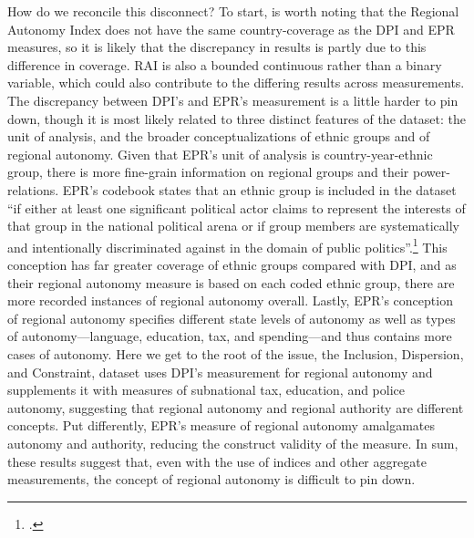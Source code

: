 \documentclass[12pt]{article}
\begin{document}
How do we reconcile this disconnect? To start, is worth noting that the Regional Autonomy Index does not have the same country-coverage as the DPI and EPR measures, so it is likely that the discrepancy in results is partly due to this difference in coverage. RAI is also a bounded continuous rather than a binary variable, which could also contribute to the differing results across measurements. The discrepancy between DPI's and EPR's measurement is a little harder to pin down, though it is most likely related to three distinct features of the dataset: the unit of analysis, and the broader conceptualizations of ethnic groups and of regional autonomy. Given that EPR's unit of analysis is country-year-ethnic group, there is more fine-grain information on regional groups and their power-relations. EPR's codebook states that an ethnic group is included in the dataset ``if either at least one significant political actor claims to represent the interests of that group in the national political arena or if group members are systematically and intentionally discriminated against in the domain of public politics''.\footcite{vogt_integrating_2015} This conception has far greater coverage of ethnic groups compared with DPI, and as their regional autonomy measure is based on each coded ethnic group, there are more recorded instances of regional autonomy overall. Lastly, EPR's conception of regional autonomy specifies different state levels of autonomy as well as types of autonomy---language, education, tax, and spending---and thus contains more cases of autonomy. Here we get to the root of the issue, the Inclusion, Dispersion, and Constraint, dataset uses DPI's measurement for regional autonomy and supplements it with measures of subnational tax, education, and police autonomy, suggesting that regional autonomy and regional authority are different concepts. Put differently, EPR's measure of regional autonomy amalgamates autonomy and authority, reducing the construct validity of the measure. In sum, these results suggest that, even with the use of indices and other aggregate measurements, the concept of regional autonomy is difficult to pin down. 
\end{document}
